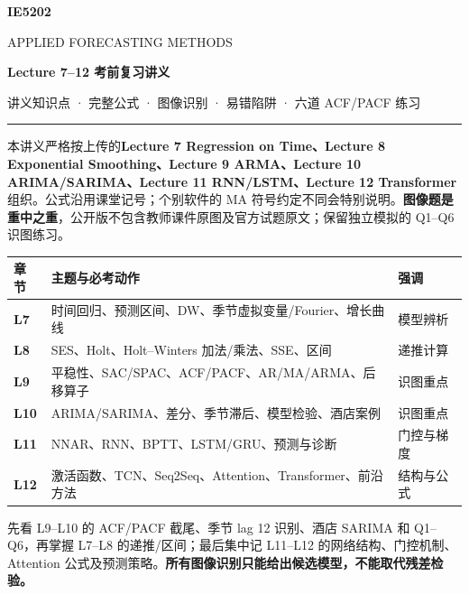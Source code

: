 \documentclass[UTF8,fontset=fandol,10.5pt,a4paper]{ctexart}
\begin{document}
\begin{center}
{\sffamily\bfseries\color{navy}\fontsize{24}{28}\selectfont IE5202}\par
\vspace{2mm}
{\Large APPLIED FORECASTING METHODS}\par\vspace{4mm}
{\huge\bfseries Lecture 7--12 考前复习讲义}\par\vspace{3mm}
{\small 讲义知识点 · 完整公式 · 图像识别 · 易错陷阱 · 六道 ACF/PACF 练习}\par
\vspace{3mm}\textcolor{graytext}{\rule{0.92\linewidth}{0.6pt}}\par
\end{center}
\begin{keybox}[title={使用说明 / Reading Guide}]
本讲义严格按上传的\textbf{Lecture 7 Regression on Time、Lecture 8 Exponential Smoothing、Lecture 9 ARMA、Lecture 10 ARIMA/SARIMA、Lecture 11 RNN/LSTM、Lecture 12 Transformer} 组织。公式沿用课堂记号；个别软件的 MA 符号约定不同会特别说明。\textbf{图像题是重中之重}，公开版不包含教师课件原图及官方试题原文；保留独立模拟的 Q1--Q6 识图练习。
\end{keybox}
\begin{center}
\begin{tabularx}{0.96\linewidth}{>{\bfseries}l X l}
\toprule
章节 & 主题与必考动作 & 强调 \tabularnewline\midrule
L7 & 时间回归、预测区间、DW、季节虚拟变量/Fourier、增长曲线 & 模型辨析 \\
L8 & SES、Holt、Holt--Winters 加法/乘法、SSE、区间 & 递推计算 \\
L9 & 平稳性、SAC/SPAC、ACF/PACF、AR/MA/ARMA、后移算子 & \textcolor{brick}{识图重点} \\
L10 & ARIMA/SARIMA、差分、季节滞后、模型检验、酒店案例 & \textcolor{brick}{识图重点} \\
L11 & NNAR、RNN、BPTT、LSTM/GRU、预测与诊断 & 门控与梯度 \\
L12 & 激活函数、TCN、Seq2Seq、Attention、Transformer、前沿方法 & 结构与公式 \\
\bottomrule
\end{tabularx}
\end{center}
\vspace{3mm}
\begin{exam}[title={考前最优学习顺序}]
先看 L9--L10 的 ACF/PACF 截尾、季节 lag 12 识别、酒店 SARIMA 和 Q1--Q6，再掌握 L7--L8 的递推/区间；最后集中记 L11--L12 的网络结构、门控机制、Attention 公式及预测策略。\textbf{所有图像识别只能给出候选模型，不能取代残差检验。}
\end{exam}
\tableofcontents
\clearpage
\end{document}
